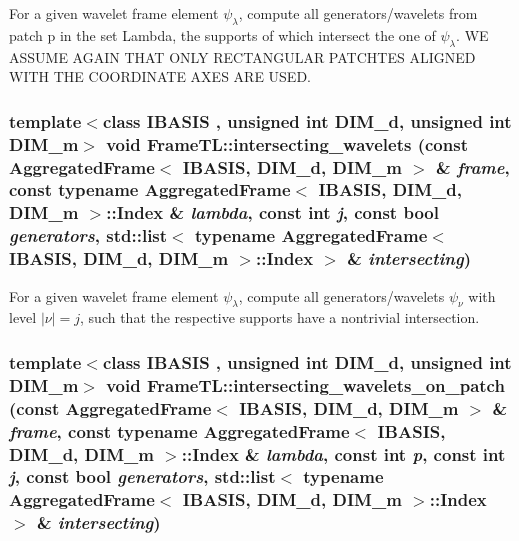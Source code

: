 For a given wavelet frame element $\psi_\lambda$, compute all generators/wavelets from patch p in the set Lambda, the supports of which intersect the one of $\psi_\lambda$. WE ASSUME AGAIN THAT ONLY RECTANGULAR PATCHTES ALIGNED WITH THE COORDINATE AXES ARE USED. \hypertarget{namespaceFrameTL_1823fb7effb657b388e652efbef319b3}{
\subsubsection[{intersecting\_\-wavelets}]{\setlength{\rightskip}{0pt plus 5cm}template$<$class IBASIS , unsigned int DIM\_\-d, unsigned int DIM\_\-m$>$ void FrameTL::intersecting\_\-wavelets (const AggregatedFrame$<$ IBASIS, DIM\_\-d, DIM\_\-m $>$ \& {\em frame}, \/  const typename AggregatedFrame$<$ IBASIS, DIM\_\-d, DIM\_\-m $>$::Index \& {\em lambda}, \/  const int {\em j}, \/  const bool {\em generators}, \/  std::list$<$ typename AggregatedFrame$<$ IBASIS, DIM\_\-d, DIM\_\-m $>$::Index $>$ \& {\em intersecting})}}
\label{namespaceFrameTL_1823fb7effb657b388e652efbef319b3}


For a given wavelet frame element $\psi_\lambda$, compute all generators/wavelets $\psi_\nu$ with level $|\nu|=j$, such that the respective supports have a nontrivial intersection. \hypertarget{namespaceFrameTL_e57f8b33a1d5167ca7a23c7762e9ad1a}{
\subsubsection[{intersecting\_\-wavelets\_\-on\_\-patch}]{\setlength{\rightskip}{0pt plus 5cm}template$<$class IBASIS , unsigned int DIM\_\-d, unsigned int DIM\_\-m$>$ void FrameTL::intersecting\_\-wavelets\_\-on\_\-patch (const AggregatedFrame$<$ IBASIS, DIM\_\-d, DIM\_\-m $>$ \& {\em frame}, \/  const typename AggregatedFrame$<$ IBASIS, DIM\_\-d, DIM\_\-m $>$::Index \& {\em lambda}, \/  const int {\em p}, \/  const int {\em j}, \/  const bool {\em generators}, \/  std::list$<$ typename AggregatedFrame$<$ IBASIS, DIM\_\-d, DIM\_\-m $>$::Index $>$ \& {\em intersecting})}}
\label{namespaceFrameTL_e57f8b33a1d5167ca7a23c7762e9ad1a}


